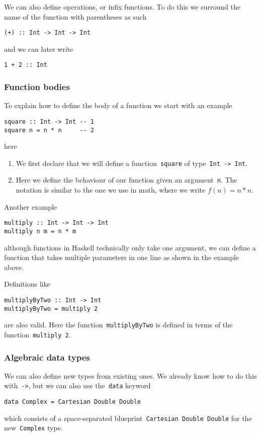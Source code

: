 \documentclass[a4paper]{article}
\theoremstyle{plain}
\theoremstyle{definition}
\begin{document}
We can also define operations, or infix functions. To do this we surround the
name of the function with parentheses as such
\begin{verbatim}
(+) :: Int -> Int -> Int
\end{verbatim}
and we can later write
\begin{verbatim}
1 + 2 :: Int
\end{verbatim}

\subsubsection{Function bodies}
To explain how to define the body of a function we start with an example
\begin{verbatim}
square :: Int -> Int -- 1
square n = n * n     -- 2
\end{verbatim}
here
\begin{enumerate}
    \item We first declare that we will define a
        function~\texttt{square} of
        type~\texttt{Int -> Int}.
    \item Here we define the behaviour of our function given an
        argument~\texttt{n}. The notation is similar to the one
        we use in math, where we write \(f(n) = n*n\).
\end{enumerate}
Another example
\begin{verbatim}
multiply :: Int -> Int -> Int
multiply n m = n * m
\end{verbatim}
although functions in Haskell technically only take one argument, we can define
a function that takes multiple parameters in one line as shown in the example
above.

Definitions like
\begin{verbatim}
multiplyByTwo :: Int -> Int
multiplyByTwo = multiply 2
\end{verbatim}
are also valid. Here the function~\texttt{multiplyByTwo} is defined
in terms of the function~\texttt{multiply 2}.

\subsubsection{Algebraic data types}
We can also define new types from existing ones. We already know how to do this
with~\texttt{->}, but we can also use
the~\texttt{data} keyword
\begin{verbatim}
data Complex = Cartesian Double Double
\end{verbatim}
which consists of a space-separated blueprint~\texttt{Cartesian
Double Double} for the new~\texttt{Complex} type.
\end{document}
